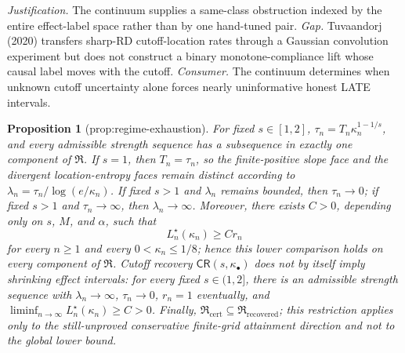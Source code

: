 \documentclass{article}
\newtheorem{proposition}{Proposition}
\begin{document}
\par\smallskip\noindent \textit{Justification.} The continuum supplies a same-class obstruction indexed by the entire effect-label space rather than by one hand-tuned pair. \textit{Gap.} Tuvaandorj (2020) transfers sharp-RD cutoff-location rates through a Gaussian convolution experiment but does not construct a binary monotone-compliance lift whose causal label moves with the cutoff. \textit{Consumer.} The continuum determines when unknown cutoff uncertainty alone forces nearly uninformative honest LATE intervals.

\begin{proposition}[prop:regime-exhaustion]\label{prop:regime-exhaustion}
For fixed \(s\in[1,2]\), \(\tau_n=T_n\kappa_n^{1-1/s}\), and every admissible strength sequence has a subsequence in exactly one component of \(\mathfrak R\). If \(s=1\), then \(T_n=\tau_n\), so the finite-positive slope face and the divergent location-entropy faces remain distinct according to \(\lambda_n=\tau_n/\log(e/\kappa_n)\). If fixed \(s>1\) and \(\lambda_n\) remains bounded, then \(\tau_n\to0\); if fixed \(s>1\) and \(\tau_n\to\infty\), then \(\lambda_n\to\infty\). Moreover, there exists \(C>0\), depending only on \(s\), \(M\), and \(\alpha\), such that \[L_n^\star(\kappa_n)\ge C r_n\] for every \(n\ge1\) and every \(0<\kappa_n\le1/8\); hence this lower comparison holds on every component of \(\mathfrak R\). Cutoff recovery \(\mathsf{CR}(s,\kappa_\bullet)\) does not by itself imply shrinking effect intervals: for every fixed \(s\in(1,2]\), there is an admissible strength sequence with \(\lambda_n\to\infty\), \(\tau_n\to0\), \(r_n=1\) eventually, and \(\liminf_{n\to\infty}L_n^\star(\kappa_n)\ge C>0\). Finally, \(\mathfrak R_{\mathrm{cert}}\subseteq\mathfrak R_{\mathrm{recovered}}\); this restriction applies only to the still-unproved conservative finite-grid attainment direction and not to the global lower bound.
\end{proposition}
\end{document}
